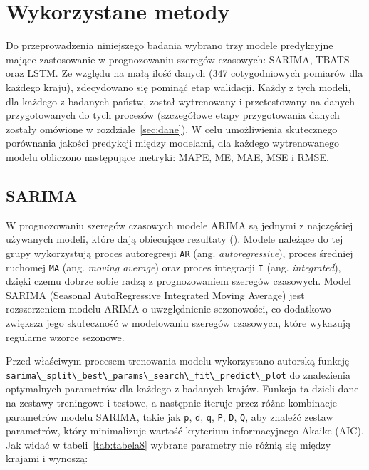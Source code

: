 \documentclass[polish, twoside, 12pt, a4paper]{article}
\theoremstyle{definition}
\theoremstyle{plain}
\theoremstyle{remark}
\newcommand{\code}[1]{\lstinline{#1}}
\begin{document}
\clearpage
\section{Wykorzystane metody}\label{sec:metody}

Do przeprowadzenia niniejszego badania wybrano trzy modele predykcyjne mające zastosowanie w prognozowaniu szeregów czasowych: SARIMA, TBATS oraz LSTM. Ze względu na małą ilość danych (347 cotygodniowych pomiarów dla każdego kraju), zdecydowano się pominąć etap walidacji. Każdy z tych modeli, dla każdego z badanych państw, został wytrenowany i przetestowany na danych przygotowanych do tych procesów (szczegółowe etapy przygotowania danych zostały omówione w rozdziale~\ref{sec:dane}). W celu umożliwienia skutecznego porównania jakości predykcji między modelami, dla każdego wytrenowanego modelu obliczono następujące metryki: MAPE, ME, MAE, MSE i RMSE.

\subsection{SARIMA}

W prognozowaniu szeregów czasowych modele ARIMA są jednymi z najczęściej używanych modeli, które dają obiecujące rezultaty (\cite{elsaraiti2021}). Modele należące do tej grupy wykorzystują proces autoregresji \code{AR} (ang. \textit{autoregressive}), proces średniej ruchomej \code{MA} (ang. \textit{moving average}) oraz proces integracji \code{I} (ang. \textit{integrated}), dzięki czemu dobrze sobie radzą z prognozowaniem szeregów czasowych. Model SARIMA (Seasonal AutoRegressive Integrated Moving Average) jest rozszerzeniem modelu ARIMA o uwzględnienie sezonowości, co dodatkowo zwiększa jego skuteczność w modelowaniu szeregów czasowych, które wykazują regularne wzorce sezonowe. 

Przed właściwym procesem trenowania modelu wykorzystano autorską funkcję \code{sarima\_split\_best\_params\_search\_fit\_predict\_plot} do znalezienia optymalnych parametrów dla każdego z badanych krajów. Funkcja ta dzieli dane na zestawy treningowe i testowe, a następnie iteruje przez różne kombinacje parametrów modelu SARIMA, takie jak \code{p}, \code{d}, \code{q}, \code{P}, \code{D}, \code{Q}, aby znaleźć zestaw parametrów, który minimalizuje wartość kryterium informacyjnego Akaike (AIC). Jak widać w tabeli~\ref{tab:tabela8} wybrane parametry nie różnią się między krajami i wynoszą:
\end{document}
